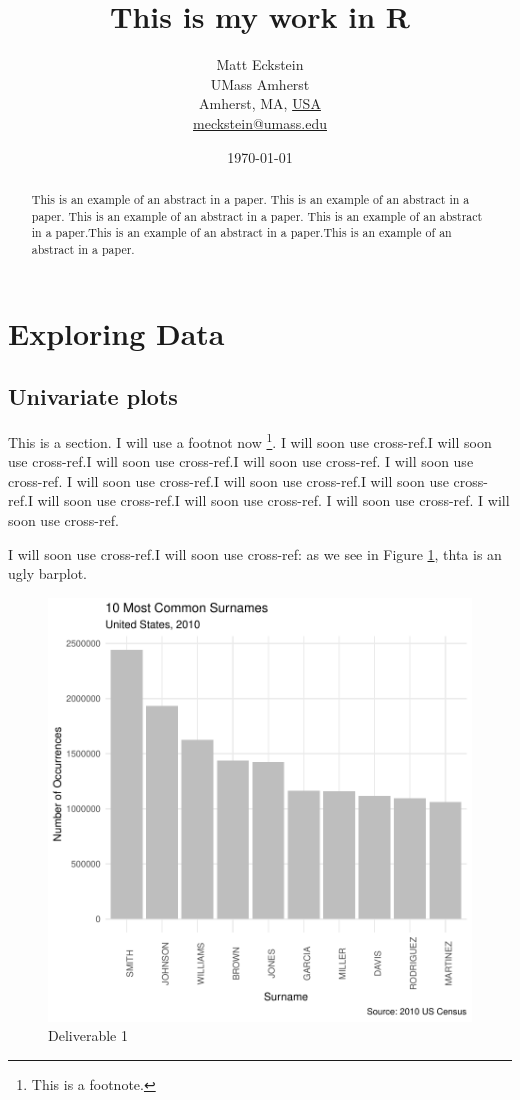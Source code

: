 \documentclass[a4paper, 12pt]{article}
\title{This is my work in R}
\author{ Matt Eckstein\\UMass Amherst\\
         Amherst, MA, \underline{USA}\\
        \url{meckstein@umass.edu}}
\date{\today}  %
\begin{document}


\maketitle 
\begin{abstract}
This is an example of an abstract in a paper. This is an example of an abstract in a paper. This is an example of an abstract in a paper. This is an example of an abstract in a paper.This is an example of an abstract in a paper.This is an example of an abstract in a paper.
\end{abstract}

\newpage

\section{Exploring Data}\label{explo-data} %

\subsection{Univariate plots}
This is a section. I will use a footnot now \footnote{This is a footnote.}. I will soon use cross-ref.I will soon use cross-ref.I will soon use cross-ref.I will soon use cross-ref. I will soon use cross-ref. I will soon use cross-ref.I will soon use cross-ref.I will soon use cross-ref.I will soon use cross-ref.I will soon use cross-ref. I will soon use cross-ref. I will soon use cross-ref.


I will soon use cross-ref.I will soon use cross-ref: as we see in Figure \ref{fig:theDeli_1}, thta is an ugly barplot.

\begin{figure}[h]
\centering
\includegraphics{draft_paper_v4-theDeli_1}
\caption{Deliverable 1}  %
\label{fig:theDeli_1} %
\end{figure}
\end{document}
